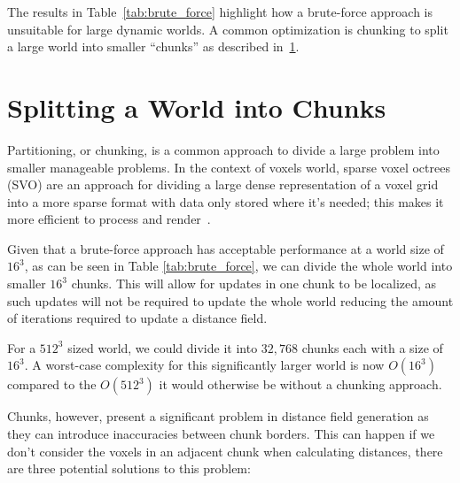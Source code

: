 The results in Table~\ref{tab:brute_force} highlight how a brute-force approach is unsuitable for large dynamic worlds.
A common optimization is chunking to split a large world into smaller ``chunks'' as described in~\ref{sec:chunking}.

\section{Splitting a World into Chunks} \label{sec:chunking}
Partitioning, or chunking, is a common approach to divide a large problem into smaller manageable problems. In the
context of voxels world, sparse voxel octrees (SVO) are an approach for dividing a large dense representation of a voxel
grid into a more sparse format with data only stored where it's needed; this makes it more efficient to process and
render~\cite{laine2010efficient,mileff2019simplified,van2015real}.

Given that a brute-force approach has acceptable performance at a world size of \(16^3\), as can be seen in Table
\ref{tab:brute_force}, we can divide the whole world into smaller \(16^3\) chunks. This will allow for updates in one
chunk to be localized, as such updates will not be required to update the whole world reducing the amount of iterations
required to update a distance field.

For a \(512^3\) sized world, we could divide it into \(32,768\) chunks each with a size of \(16^3\). A worst-case
complexity for this significantly larger world is now \(O(16^3)\) compared to the \(O(512^3)\) it would otherwise be
without a chunking approach.

Chunks, however, present a significant problem in distance field generation as they can introduce inaccuracies between
chunk borders. This can happen if we don't consider the voxels in an adjacent chunk when calculating distances, there
are three potential solutions to this problem:

